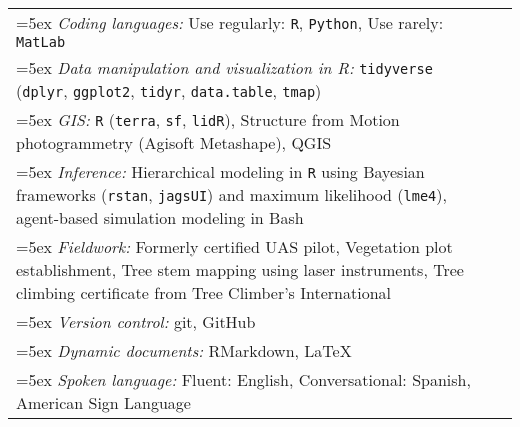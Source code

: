 \begin{longtable}{@{}>{\raggedright}p{6.25in} >{\raggedleft}X@{}}

\hangindent=5ex \emph{Coding languages:} Use regularly: \texttt{R}, \texttt{Python}, Use rarely: \texttt{MatLab} & \tabularnewline

\hangindent=5ex \emph{Data manipulation and visualization in R:} \texttt{tidyverse} (\texttt{dplyr}, \texttt{ggplot2}, \texttt{tidyr}, \texttt{data.table}, \texttt{tmap}) & \tabularnewline

\hangindent=5ex \emph{GIS:} \texttt{R} (\texttt{terra}, \texttt{sf}, \texttt{lidR}), Structure from Motion photogrammetry (Agisoft Metashape), QGIS & \tabularnewline


\hangindent=5ex \emph{Inference:} Hierarchical modeling in \texttt{R} using Bayesian frameworks (\texttt{rstan}, \texttt{jagsUI}) and maximum likelihood (\texttt{lme4}), agent-based simulation modeling in Bash  & \tabularnewline

\hangindent=5ex \emph{Fieldwork:} Formerly certified UAS pilot, Vegetation plot establishment, Tree stem mapping using laser instruments, Tree climbing certificate from Tree Climber's International & \tabularnewline %

\hangindent=5ex \emph{Version control:} git, GitHub & \tabularnewline

\hangindent=5ex \emph{Dynamic documents:} RMarkdown, \LaTeX{} & \tabularnewline

\hangindent=5ex \emph{Spoken language:} Fluent: English, Conversational: Spanish, American Sign Language & \tabularnewline

\end{longtable}
